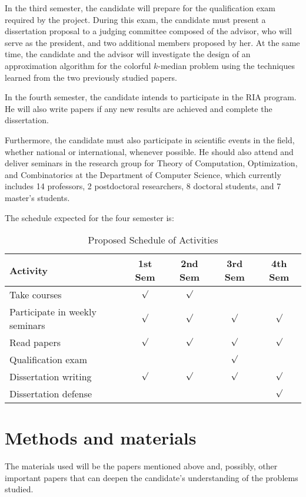 \documentclass[12pt]{article}
\begin{document}
In the third semester, the candidate will prepare for the qualification exam required by the project. 
During this exam, the candidate must present a dissertation proposal to a judging committee composed of the advisor, who will serve as the president, and two additional members proposed by her.
At the same time, the candidate and the advisor will investigate the design of an approximation algorithm for the colorful $k$-median problem using the techniques learned from the two previously studied papers.

In the fourth semester, the candidate intends to participate in the RIA program.
He will also write papers if any new results are achieved and complete the dissertation.

Furthermore, the candidate must also participate in scientific events in the field, whether national or international, whenever possible. He should also attend and deliver seminars in the research group for Theory of Computation, Optimization, and Combinatorics at the Department of Computer Science, which currently includes 14 professors, 2 postdoctoral researchers, 8 doctoral students, and 7 master's students.

The schedule expected for the four semester is:

\begin{table}[ht]
\centering
\begin{tabular}{|l|c|c|c|c|}
\hline
\textbf{Activity} & \textbf{1st Sem} & \textbf{2nd Sem} & \textbf{3rd Sem} & \textbf{4th Sem} \\
\hline
Take courses                  & \(\surd\) & \(\surd\) &        &        \\
Participate in weekly seminars & \(\surd\) & \(\surd\) & \(\surd\) & \(\surd\) \\
Read papers           & \(\surd\) & \(\surd\) & \(\surd\) &   \(\surd\)     \\
Qualification exam            &          &          & \(\surd\) &        \\
Dissertation writing          &   \(\surd\)       &    \(\surd\)      & \(\surd\) & \(\surd\) \\
Dissertation defense          &          &          &          & \(\surd\) \\
\hline
\end{tabular}
\caption{Proposed Schedule of Activities}
\end{table}

\section{Methods and materials}
The materials used will be the papers mentioned above and, possibly, other important papers that can deepen the candidate’s understanding of the problems studied.
\end{document}
